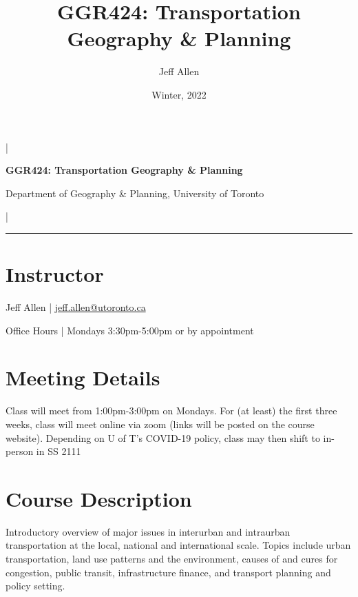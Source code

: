 \documentclass[11pt]{article}
\title{\textbf{GGR424: Transportation Geography \& Planning}}
\author{Jeff Allen}
\date{Winter, 2022}
\begin{document}
	\allsectionsfont{\sffamily}
	
	
	\begin{center}
		
		|
		
		\Large{\textsf{\textbf{GGR424: Transportation Geography \& Planning}}}
		
		\normalsize
				
		Department of Geography \& Planning, University of Toronto
		
		|
		
		
		
		\vspace{5 mm}
		
		\hrule
		
	\end{center}
		

	
	
	
	\vspace{3 mm}
	
	
	\section*{\textsf{Instructor}}
	
	Jeff Allen | \url{jeff.allen@utoronto.ca}
	
	Office Hours | Mondays 3:30pm-5:00pm or by appointment
	
	
	
	\section*{\textsf{Meeting Details}}
	
	Class will meet from 1:00pm-3:00pm on Mondays. For (at least) the first three weeks, class will meet online via zoom (links will be posted on the course website). Depending on U of T's COVID-19 policy, class may then shift to in-person in SS 2111
	
	
	
	\section*{Course Description}
	
	Introductory overview of major issues in interurban and intraurban transportation at the local, national and international scale. Topics include urban transportation, land use patterns and the environment, causes of and cures for congestion, public transit, infrastructure finance, and transport planning and policy setting. 
	
\end{document}
